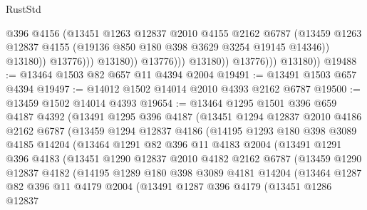 \begin{lexlean}{RustStd}
\begin{coremodule}
                                    @396
                                    @4156
                                    (@13451
                                      @1263
                                      @12837
                                      @2010
                                      @4155
                                      @2162
                                      @6787
                                      (@13459
                                        @1263
                                        @12837
                                        @4155
                                        (@19136 @850 @180 @398 @3629 @3254 @19145 @14346))
                                      @13180))
                                  @13776)))
                            @13180))
                        @13776)))
                  @13180))
              @13776)))
        @13180))
@19488 := @13464 @1503 @82 @657 @11 @4394 @2004
@19491 := @13491 @1503 @657 @4394
@19497 := @14012 @1502 @14014 @2010 @4393 @2162 @6787
@19500 := @13459 @1502 @14014 @4393
@19654 := @13464
    @1295
    @1501
    @396
    @659
    @4187
    @4392
    (@13491
      @1295
      @396
      @4187
      (@13451
        @1294
        @12837
        @2010
        @4186
        @2162
        @6787
        (@13459
          @1294
          @12837
          @4186
          (@14195
            @1293
            @180
            @398
            @3089
            @4185
            @14204
            (@13464
              @1291
              @82
              @396
              @11
              @4183
              @2004
              (@13491
                @1291
                @396
                @4183
                (@13451
                  @1290
                  @12837
                  @2010
                  @4182
                  @2162
                  @6787
                  (@13459
                    @1290
                    @12837
                    @4182
                    (@14195
                      @1289
                      @180
                      @398
                      @3089
                      @4181
                      @14204
                      (@13464
                        @1287
                        @82
                        @396
                        @11
                        @4179
                        @2004
                        (@13491
                          @1287
                          @396
                          @4179
                          (@13451
                            @1286
                            @12837

\end{coremodule}
\end{lexlean}
